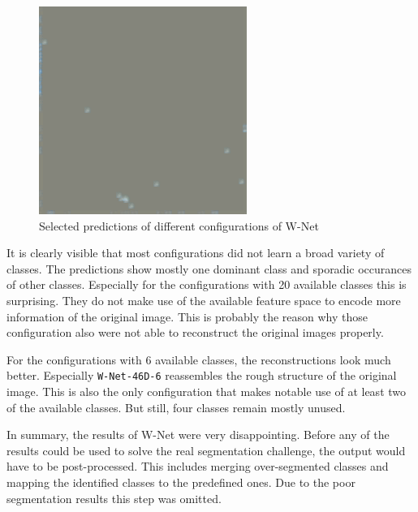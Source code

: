 \begin{figure}
    \includegraphics[width=\WnetPredictionsImageWidth]{images/wnet/46d-20/224817-restored}

    \caption{Selected predictions of different configurations of W-Net}
    \label{fig:wnet_prediction_images}
\end{figure}

It is clearly visible that most configurations did not learn a broad variety of classes. The predictions show mostly one dominant class and sporadic occurances of other classes. Especially for the configurations with 20 available classes this is surprising. They do not make use of the available feature space to encode more information of the original image. This is probably the reason why those configuration also were not able to reconstruct the original images properly.

For the configurations with 6 available classes, the reconstructions look much better. Especially \texttt{W-Net-46D-6} reassembles the rough structure of the original image. This is also the only configuration that makes notable use of at least two of the available classes. But still, four classes remain mostly unused.

In summary, the results of W-Net were very disappointing. Before any of the results could be used to solve the real segmentation challenge, the output would have to be post-processed. This includes merging over-segmented classes and mapping the identified classes to the predefined ones. Due to the poor segmentation results this step was omitted.

